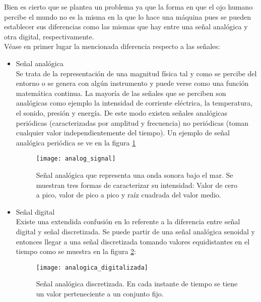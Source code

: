 Bien es cierto que se plantea un problema ya que la forma en que el ojo humano percibe el mundo no es la misma en la que lo hace una máquina pues se pueden establecer sus diferencias como las mismas que hay entre una señal analógica y otra digital, respectivamente.
\\
Véase en primer lugar la mencionada diferencia respecto a las señales:

\begin{itemize}
\item Señal analógica
\\
Se trata de la representación de una magnitud física tal y como se percibe del entorno o se genera con algún instrumento y puede verse como una función matemática continua.
La mayoría de las señales que se perciben son analógicas como ejemplo la intensidad de corriente eléctrica, la temperatura, el sonido, presión y energía.
De este modo existen señales analógicas periódicas (caracterizadas por amplitud y frecuencia) no periódicas (toman cualquier valor independientemente del tiempo). Un ejemplo de señal analógica periódica\cite{señal_analogica} se ve en la figura \ref{fig:analog_signal}

\begin{figure}[!htb]
\centering
{}
  \texttt{[image: analog\_signal]}
  \caption{Señal analógica que representa una onda sonora bajo el mar. Se muestran tres formas de caracterizar su intensidad: Valor de cero a pico, valor de pico a pico y raíz cuadrada del valor medio.}\label{fig:analog_signal}
  
\endminipage\hfill
\end{figure}

\item Señal digital
\\
Existe una extendida confusión en lo referente a la diferencia entre señal digital y señal discretizada. Se puede partir de una señal analógica senoidal y entonces llegar a una señal discretizada tomando valores equidistantes en el tiempo como se muestra en la figura \ref{fig:analogica_digitalizada}:
\begin{figure}[!htb]
\centering
{}
  \texttt{[image: analogica\_digitalizada]}
  \caption{Señal analógica discretizada. En cada instante de tiempo se tiene un valor perteneciente a un conjunto fijo.}\label{fig:analogica_digitalizada}
\endminipage\hfill
\end{figure}


\end{itemize}
